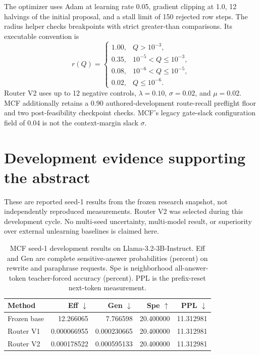 \documentclass{article}
\newif\ifincludedevelopmentevidence
\begin{document}
The optimizer uses Adam at learning rate 0.05, gradient clipping at 1.0,
12 halvings of the initial proposal, and a stall limit of 150 rejected row
steps. The radius helper checks breakpoints with strict greater-than
comparisons. Its executable convention is
\begin{equation}
 r(Q)=\begin{cases}
 1.00,&Q>10^{-3},\\
 0.35,&10^{-5}<Q\leq10^{-3},\\
 0.08,&10^{-6}<Q\leq10^{-5},\\
 0.02,&Q\leq10^{-6}.
 \end{cases}
 \label{eq:radius}
\end{equation}
Router V2 uses up to 12 negative controls, $\lambda=0.10$,
$\sigma=0.02$, and $\mu=0.02$. MCF additionally retains a 0.90 authored-development
route-recall preflight floor and two post-feasibility checkpoint
checks. MCF's legacy gate-slack configuration field of 0.04 is not the
context-margin slack $\sigma$.

\ifincludedevelopmentevidence
\section{Development evidence supporting the abstract}
\label{app:evidence}

These are reported seed-1 results from the frozen research snapshot, not
independently reproduced measurements. Router V2 was selected during this
development cycle. No multi-seed uncertainty, multi-model result, or superiority
over external unlearning baselines is claimed here. 






\begin{table}[t]
\centering
\small
\caption{MCF seed-1 development results on Llama-3.2-3B-Instruct.
Eff and Gen are complete sensitive-answer probabilities (percent) on rewrite
and paraphrase requests. Spe is neighborhood all-answer-token teacher-forced
accuracy (percent). PPL is the prefix-reset next-token measurement.}
\label{tab:mcf-seed1-eff-gen-spe-ppl}
\begin{tabular}{@{}lrrrr@{}}
\toprule
Method & Eff $\downarrow$ & Gen $\downarrow$ & Spe $\uparrow$ & PPL $\downarrow$ \\
\midrule
Frozen base & 12.266065 & 7.766598 & 20.400000 & 11.312981 \\
Router V1   & 0.000066955 & 0.000230665 & 20.400000 & 11.312981 \\
Router V2   & 0.000178522 & 0.000595133 & 20.400000 & 11.312981 \\
\bottomrule
\end{tabular}
\end{table}
\end{document}
